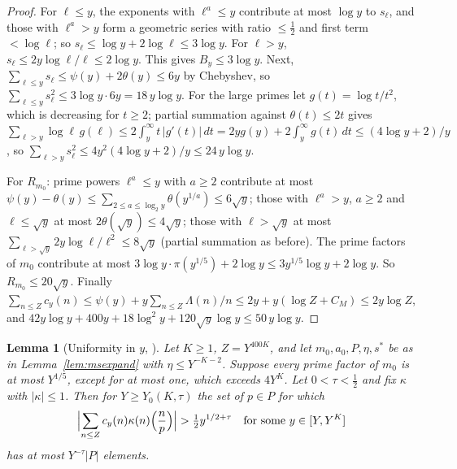 \documentclass[11pt]{amsart}
\theoremstyle{plain}
\newtheorem{lemma}[theorem]{Lemma}
\theoremstyle{definition}
\numberwithin{equation}{section}
\begin{document}
\begin{proof}
For $\ell\le y$, the exponents with $\ell^a\le y$ contribute at most $\log y$ to $s_\ell$, and those
with $\ell^a>y$ form a geometric series with ratio $\le\frac12$ and first term $<\log\ell$; so
$s_\ell\le\log y+2\log\ell\le3\log y$. For $\ell>y$, $s_\ell\le2y\log\ell/\ell\le2\log y$. This gives
$B_y\le3\log y$. Next, $\sum_{\ell\le y}s_\ell\le\psi(y)+2\theta(y)\le6y$ by Chebyshev, so
$\sum_{\ell\le y}s_\ell^2\le3\log y\cdot6y=18\,y\log y$. For the large primes let
$g(t)=\log t/t^2$, which is decreasing for $t\ge2$; partial summation against $\theta(t)\le2t$ gives
$\sum_{\ell>y}\log\ell\,g(\ell)\le2\int_y^\infty t\,|g'(t)|\,dt=2yg(y)+2\int_y^\infty g(t)\,dt\le(4\log y+2)/y$,
so $\sum_{\ell>y}s_\ell^2\le4y^2(4\log y+2)/y\le24\,y\log y$.

For $R_{m_0}$: prime powers $\ell^a\le y$ with $a\ge2$ contribute at most
$\psi(y)-\theta(y)\le\sum_{2\le a\le\log_2y}\theta(y^{1/a})\le6\sqrt y$; those with $\ell^a>y$, $a\ge2$
and $\ell\le\sqrt y$ at most $2\theta(\sqrt y)\le4\sqrt y$; those with $\ell>\sqrt y$ at most
$\sum_{\ell>\sqrt y}2y\log\ell/\ell^2\le8\sqrt y$ (partial summation as before). The prime factors of
$m_0$ contribute at most $3\log y\cdot\pi(y^{1/5})+2\log y\le3y^{1/5}\log y+2\log y$. So
$R_{m_0}\le20\sqrt y$. Finally
$\sum_{n\le Z}c_y(n)\le\psi(y)+y\sum_{n\le Z}\Lambda(n)/n\le2y+y(\log Z+C_M)\le2y\log Z$, and
$42y\log y+400y+18\log^2y+120\sqrt y\log y\le50\,y\log y$.
\end{proof}

\begin{lemma}[Uniformity in $y$, ]\label{lem:badshare}
Let $K\ge1$, $Z=Y^{400K}$, and let $m_0,a_0,P,\eta,s^\ast$ be as in Lemma~\ref{lem:msexpand}
with $\eta\le Y^{-K-2}$. Suppose every prime factor of $m_0$ is at most $Y^{1/5}$, except for at
most one, which exceeds $4Y^K$. Let $0<\tau<\frac12$
and fix $\kappa$ with $|\kappa|\le1$. Then for $Y\ge Y_0(K,\tau)$ the set of $p\in P$ for which
\[
\Bigl|\sum_{n\le Z}c_y(n)\kappa(n)\Bigl(\frac np\Bigr)\Bigr|>\tfrac12y^{1/2+\tau}\quad\text{for some }y\in[Y,Y^K]
\]
has at most $Y^{-\tau}|P|$ elements.
\end{lemma}
\end{document}
